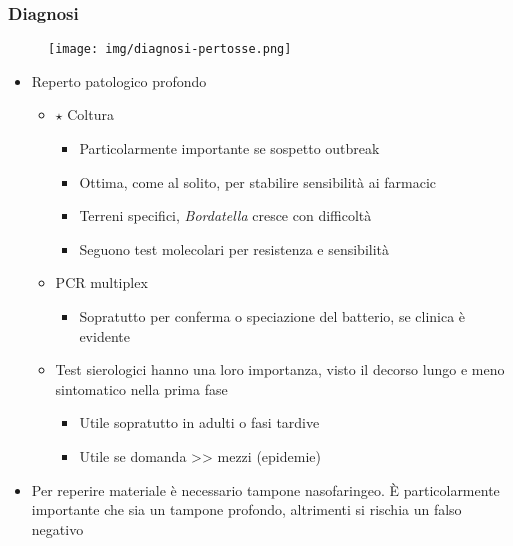 \documentclass[italian,]{article}
\providecommand{\tightlist}{%
  \setlength{\itemsep}{0pt}\setlength{\parskip}{0pt}}
\newcommand{\goldstandard}{\textcircled{$\star$} }                      %
\begin{document}
\hypertarget{diagnosi-10}{%
\subsubsection{Diagnosi}\label{diagnosi-10}}

\begin{figure}[H]
\centering
    \texttt{[image: img/diagnosi-pertosse.png]}
\end{figure}

\begin{itemize}
\tightlist
\item
  Reperto patologico profondo

  \begin{itemize}
  \tightlist
  \item
    \goldstandard Coltura

    \begin{itemize}
    \tightlist
    \item
      Particolarmente importante se sospetto outbreak
    \item
      Ottima, come al solito, per stabilire sensibilità ai farmacic
    \item
      Terreni specifici, \emph{Bordatella} cresce con difficoltà
    \item
      Seguono test molecolari per resistenza e sensibilità
    \end{itemize}
  \item
    PCR multiplex

    \begin{itemize}
    \tightlist
    \item
      Sopratutto per conferma o speciazione del batterio, se clinica è
      evidente
    \end{itemize}
  \item
    Test sierologici hanno una loro importanza, visto il decorso lungo e
    meno sintomatico nella prima fase

    \begin{itemize}
    \tightlist
    \item
      Utile sopratutto in adulti o fasi tardive
    \item
      Utile se domanda \textgreater{}\textgreater{} mezzi (epidemie)
    \end{itemize}
  \end{itemize}
\item
  Per reperire materiale è necessario tampone nasofaringeo. È
  particolarmente importante che sia un tampone profondo, altrimenti si
  rischia un falso negativo
\end{itemize}
\end{document}
